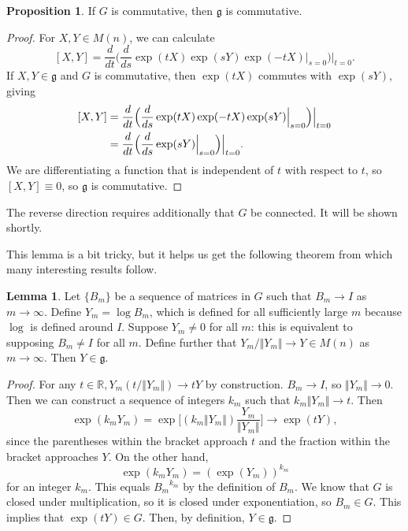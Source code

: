 \documentclass[12pt]{article}
\newcommand{\R}{\mathbb{R}}
\newcommand{\g}{\mathfrak{g}}
\newcommand{\V}{\Vert}
\theoremstyle{definition}
\newtheorem{prop}[them]{Proposition}
\theoremstyle{definition}
\theoremstyle{definition}
\newtheorem{lem}[them]{Lemma}
\theoremstyle{definition}
\theoremstyle{definition}
\theoremstyle{definition}
\theoremstyle{definition}
\theoremstyle{definition}
\begin{document}
\begin{prop}
If $G$ is commutative, then $\g$ is commutative.
\end{prop}
\begin{proof}
For $X, Y \in M(n)$, we can calculate
\[
[X,Y] = \frac{d}{dt}\Big(\frac{d}{ds}\exp(tX)\exp(sY)\exp(-tX)\Big|_{s=0} \Big)\Big|_{t=0}.
\] 
If $X, Y \in \g$ and $G$ is commutative, then $\exp(tX)$ commutes with $\exp(sY)$, giving 
\[
\begin{aligned}
    \relax [X, Y] & = \frac{d}{dt}\Big(\frac{d}{ds}\exp(tX)\exp(-tX)\exp(sY)\Big|_{s=0}\Big)\Big|_{t=0} \\
    & = \frac{d}{dt}\Big(\frac{d}{ds}\exp(sY)\Big|_{s=0}\Big)\Big|_{t=0}.
\end{aligned}
\] We are differentiating a function that is independent of $t$ with respect to $t$, so $[X,Y] \equiv 0$, so $\g$ is commutative.
\end{proof}

\par{The reverse direction requires additionally
that $G$ be connected. It will be shown shortly.}

\vspace{6pt}
\par{This lemma is a bit tricky, but it helps us get the following theorem from which many interesting results follow.}

\begin{lem}\label{lem:algseq}
Let $\{B_m\}$ be a sequence of matrices in $G$
such that $B_m \to I$ as $m \to \infty$.
Define $Y_m = \log B_m$, which is defined for
all sufficiently large $m$ because $\log$ is
defined around $I$. Suppose $Y_m \neq 0$ for all
$m$: this is equivalent to supposing
$B_m \neq I$ for all $m$. Define further that
$Y_m / \V Y_m \V \to Y \in M(n)$ as $m \to
\infty$. Then $Y \in \g$.
\end{lem}

\begin{proof}
For any $t \in \R, Y_m(t / \V Y_m \V) \to tY$
by construction. $B_m \to I$, so $\V Y_m \V
\to 0$. Then we can construct a sequence of
integers $k_m$ such that $k_m \V Y_m \V \to
t$. Then
\[
\exp(k_m Y_m) = \exp\Big[(k_m \V Y_m \V) \frac{Y_m}{\V Y_m \V} \Big] \to \exp(tY),
\] 
since
the parentheses within the bracket approach $t$
and the fraction within the bracket approaches
$Y$. On the other hand, 
\[
\exp(k_m Y_m) = {(\exp(Y_m))}^{k_m}
\]
for an integer $k_m$. This
equals ${B_m}^{k_m}$ by the definition of $B_m$.
We know that $G$ is closed under multiplication,
so it is closed under exponentiation, so $B_m \in
G$. This implies that $\exp(tY) \in G$. Then, by
definition, $Y \in \g$. 
\end{proof}
\end{document}

